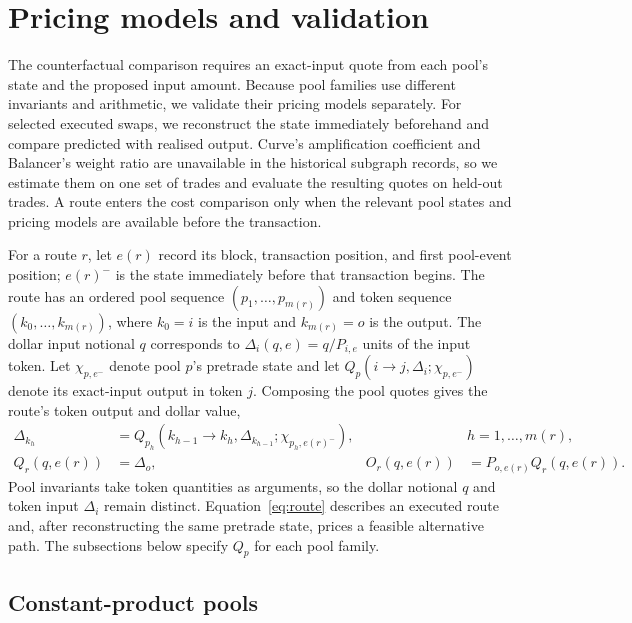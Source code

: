 \section{Pricing models and validation}
\label{app:quoters}

The counterfactual comparison requires an exact-input quote from each pool's state and the proposed input amount. Because pool families use different invariants and arithmetic, we validate their pricing models separately. For selected executed swaps, we reconstruct the state immediately beforehand and compare predicted with realised output. Curve's amplification coefficient and Balancer's weight ratio are unavailable in the historical subgraph records, so we estimate them on one set of trades and evaluate the resulting quotes on held-out trades. A route enters the cost comparison only when the relevant pool states and pricing models are available before the transaction.

For a route $r$, let $e(r)$ record its block, transaction position, and first pool-event position; $e(r)^-$ is the state immediately before that transaction begins. The route has an ordered pool sequence $(p_{1},\ldots,p_{m(r)})$ and token sequence $(k_0,\ldots,k_{m(r)})$, where $k_0=i$ is the input and $k_{m(r)}=o$ is the output. The dollar input notional $q$ corresponds to $\Delta_i(q,e)=q/P_{i,e}$ units of the input token. Let $\chi_{p,e^-}$ denote pool $p$'s pretrade state and let $Q_p(i\to j,\Delta_i;\chi_{p,e^-})$ denote its exact-input output in token $j$. Composing the pool quotes gives the route's token output and dollar value,
\begin{equation}
\label{eq:route}
\begin{aligned}
\Delta_{k_h}&=Q_{p_h}\!\left(k_{h-1}\to k_h,\Delta_{k_{h-1}};\chi_{p_h,e(r)^-}\right),
&&h=1,\ldots,m(r),\\
Q_r(q,e(r))&=\Delta_o,
&O_r(q,e(r))&=P_{o,e(r)}Q_r(q,e(r)).
\end{aligned}
\end{equation}
Pool invariants take token quantities as arguments, so the dollar notional $q$ and token input $\Delta_i$ remain distinct. Equation~\eqref{eq:route} describes an executed route and, after reconstructing the same pretrade state, prices a feasible alternative path. The subsections below specify $Q_p$ for each pool family.

\subsection{Constant-product pools}
\label{app:quoters:cp}


